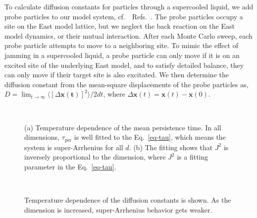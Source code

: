 \documentclass[showpacs,pre,aps,twocolumn,superscriptaddress]{revtex4-1}
\begin{document}
To calculate diffusion constants for particles through a supercooled liquid, we add  probe particles to our model system, cf.~\ Refs.~\cite{Jung2004,Jung2005,Berthier2005E}. 
The probe particles occupy a site on the East model lattice, but we neglect the 
back reaction on the East model dynamics, or their mutual interaction. 
After each Monte Carlo sweep, each probe particle attempts to move to a neighboring site. To mimic the effect of jamming in a supercooled liquid, a probe particle can only move if it is on an excited site of the underlying East model, and to satisfy detailed balance, they can only move if their target site is also excitated.
We then determine the diffusion constant from the mean-square displacements of the probe particles as,
$D=\lim_{t\rightarrow\infty}\langle[\Delta \mathbf{x(t)}]^2\rangle/2dt$, where $\Delta \mathbf{x}(t)=\mathbf{x}(t)-\mathbf{x}(0)$.


\begin{figure}[h]
 \begin{center}
 \mbox{
     \hspace{-17pt}
     \hspace{-40pt}
 }
 \end{center}
 \vspace{-20pt}
 \caption{\label{fig1}  
(a) Temperature dependence of the mean persistence time.
In all dimensions, $\tau_{\text{per}}$ is well fitted to the Eq.~\ref{eq-tau}, which means the system is                         super-Arrhenius for all $d$.
(b) The fitting shows that $J^2$ is inversely proportional to the dimension, where $J^2$ is a fitting parameter in the Eq.~\ref{eq-tau}.
 }
\end{figure}

\begin{figure}[h]
 \begin{center}
 \mbox{
     \hspace{-17pt}
 }
 \end{center}
 \vspace{-20pt}
 \caption{\label{fig2}  
                        Temperature dependence of the diffusion constants is shown. 
                            As the dimension is increased, super-Arrhenius behavior gets weaker.
 }
\end{figure}
\end{document}
